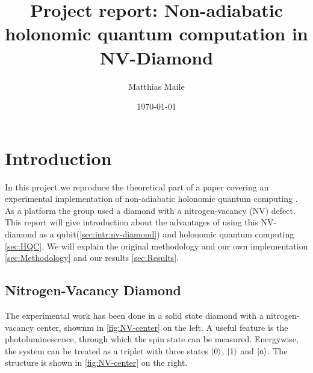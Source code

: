 \documentclass[%
reprint,
amsmath,amssymb,
aps,
]{revtex4-2}
\begin{document}
\title{Project report: Non-adiabatic holonomic quantum computation in NV-Diamond}%

\author{Matthias Maile}

\date{\today}%


\maketitle

\tableofcontents

\section{Introduction}
\label{sec:Introduction}
In this project we reproduce the theoretical part of a paper covering an experimental
implementation of non-adiabatic holonomic quantum computing \cite{PhysRevApplied.16.024060}. 
As a platform the group used a diamond with a nitrogen-vacancy (NV) defect. This report will give 
introduction about the advantages of using this NV-diamond as a qubit(\autoref{sec:intr:nv-diamond})
and holonomic quantum computing \autoref{sec:HQC}. We will explain the original methodology and our
own implementation \autoref{sec:Methodology} and our results \autoref{sec:Results}.

\subsection{Nitrogen-Vacancy Diamond}
\label{sec:intr:nv-diamond}
The experimental work has been done in a solid state diamond with a nitrogen-vacancy center, shownm
in \autoref{fig:NV-center} on the left. A useful feature is the photoluminescence, through which the
spin state can be measured. Energywise, the system can be treated as a triplet with three states
$\ket{0}$, $\ket{1}$ and $\ket{a}$. The structure is shown in \autoref{fig:NV-center} on the right.
\end{document}
